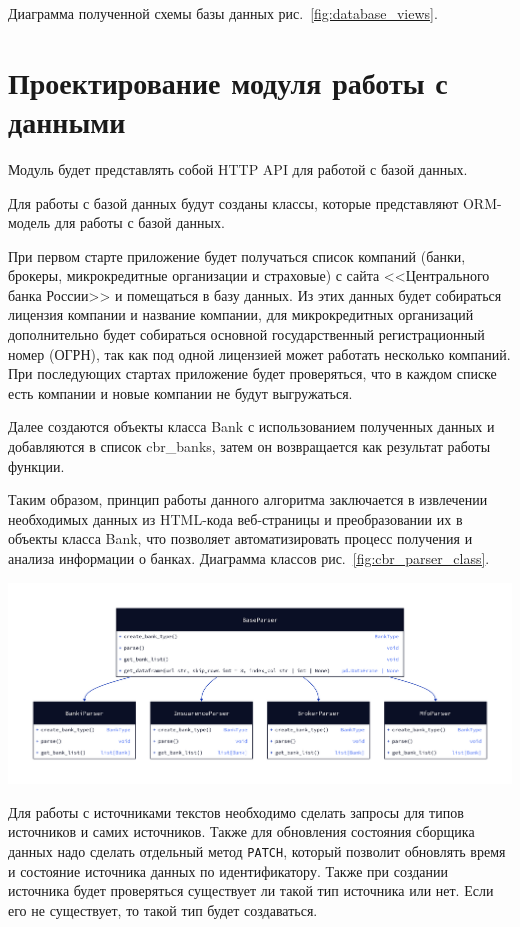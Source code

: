 \documentclass[PI, VKR]{HSEUniversity}
\begin{document}
Диаграмма полученной схемы базы данных рис.~\ref{fig:database_views}.
\section{Проектирование модуля работы с данными}
\label{sec:org838e55c}
Модуль будет представлять собой HTTP API для работой с базой данных.

Для работы с базой данных будут созданы классы, которые представляют ORM-модель для работы с базой данных.

При первом старте приложение будет получаться список компаний (банки, брокеры, микрокредитные организации и страховые) с сайта {}<<Центрального банка России>>{} и помещаться в базу данных. Из этих данных будет собираться лицензия компании и название компании, для микрокредитных организаций дополнительно будет собираться основной государственный регистрационный номер (ОГРН), так как под одной лицензией может работать несколько компаний. При последующих стартах приложение будет проверяться, что в каждом списке есть компании и новые компании не будут выгружаться.

Далее создаются объекты класса Bank с использованием полученных данных и добавляются в список  cbr\_banks, затем он возвращается как результат работы функции.

Таким образом, принцип работы данного алгоритма заключается в извлечении необходимых данных из HTML-кода веб-страницы и преобразовании их в объекты класса Bank, что позволяет автоматизировать процесс получения и анализа информации о банках. Диаграмма классов рис.~\ref{fig:cbr_parser_class}.

\begin{center}
\includegraphics[width=.9\linewidth]{img/d2/cbr_parser_class.png}
\end{center}

Для работы с источниками текстов необходимо сделать запросы для типов источников и самих источников. Также для обновления состояния сборщика данных надо сделать отдельный метод \texttt{PATCH}, который позволит обновлять время и состояние источника данных по идентификатору. Также при создании источника будет проверяться существует ли такой тип источника или нет. Если его не существует, то такой тип будет создаваться.
\end{document}
